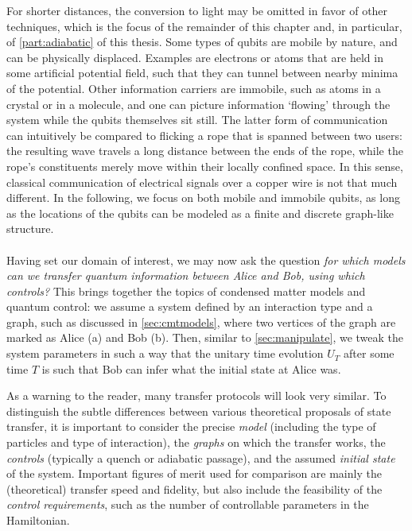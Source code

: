 For shorter distances, the conversion to light may be omitted in favor of other techniques, which is the focus of the remainder of this chapter and, in particular, of \cref{part:adiabatic} of this thesis. Some types of qubits are mobile by nature, and can be physically displaced. Examples are electrons or atoms that are held in some artificial potential field, such that they can tunnel between nearby minima of the potential.
%
Other information carriers are immobile, such as atoms in a crystal or in a molecule, and one can picture information `flowing' through the system while the qubits themselves sit still. The latter form of communication can intuitively be compared to flicking a rope that is spanned between two users: the resulting wave travels a long distance between the ends of the rope, while the rope's constituents merely move within their locally confined space. In this sense, classical communication of electrical signals over a copper wire is not that much different. In the following, we focus on both mobile and immobile qubits, as long as the locations of the qubits can be modeled as a finite and discrete graph-like structure. 

\paragraph{}
Having set our domain of interest, we may now ask the question \emph{for which models can we transfer quantum information between Alice and Bob, using which controls?} This brings together the topics of condensed matter models and quantum control: we assume a system defined by an interaction type and a graph, such as discussed in \cref{sec:cmtmodels}, where two vertices of the graph are marked as Alice (a) and Bob (b). Then, similar to \cref{sec:manipulate}, we tweak the system parameters in such a way that the unitary time evolution $U_T$ after some time $T$ is such that Bob can infer what the initial state at Alice was. 


As a warning to the reader, many transfer protocols will look very similar. To distinguish the subtle differences between various theoretical proposals of state transfer, it is important to consider the precise \emph{model} (including the type of particles and type of interaction), the \emph{graphs} on which the transfer works, the \emph{controls} (typically a quench or adiabatic passage), and the assumed \emph{initial state} of the system. 
Important figures of merit used for comparison are mainly the (theoretical) transfer speed and fidelity, but also include the feasibility of the \emph{control requirements}, such as the number of controllable parameters in the Hamiltonian. 

